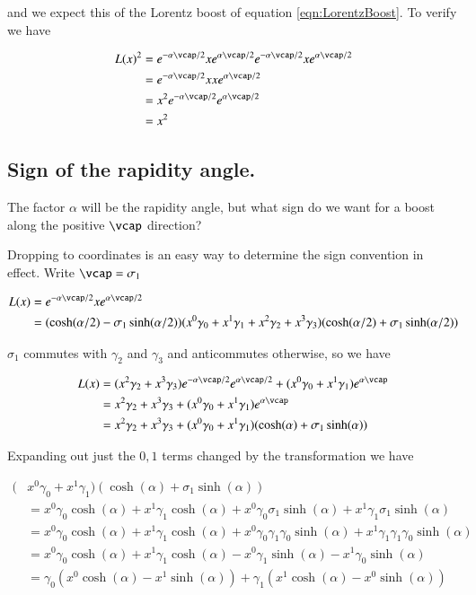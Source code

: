 \documentclass{article}
\begin{document}
and we expect this of the Lorentz boost of equation \ref{eqn:LorentzBoost}.  To verify we have

\begin{align*}
L(x)^2 
&=
e^{-\alpha \vcap/2}
x
e^{\alpha \vcap/2}
e^{-\alpha \vcap/2}
x
e^{\alpha \vcap/2} \\
&=
e^{-\alpha \vcap/2}
x
x
e^{\alpha \vcap/2} \\
&=
x^2
e^{-\alpha \vcap/2}
e^{\alpha \vcap/2} \\
&=
x^2
\end{align*}

\subsection{ Sign of the rapidity angle. }

The factor $\alpha$ will be the rapidity angle, but what sign do we want for a boost along the positive $\vcap$ direction?

Dropping to coordinates is an easy way to determine the sign convention in effect.  Write $\vcap = \sigma_1$

\begin{align*}
L(x) &= 
e^{-\alpha \vcap/2}
x
e^{\alpha \vcap/2} \\
&=
(\cosh(\alpha/2) - \sigma_1 \sinh(\alpha/2))
(
x^0 \gamma_0
+x^1 \gamma_1
+x^2 \gamma_2
+x^3 \gamma_3
)
(\cosh(\alpha/2) + \sigma_1 \sinh(\alpha/2))
\end{align*}

$\sigma_1$ commutes with $\gamma_2$ and $\gamma_3$ and anticommutes otherwise, so we have

\begin{align*}
L(x) &= 
(
x^2 \gamma_2
+x^3 \gamma_3
) 
e^{-\alpha \vcap/2}
e^{\alpha \vcap/2}
+
(
x^0 \gamma_0
+x^1 \gamma_1
)
e^{\alpha \vcap} \\
&=
x^2 \gamma_2
+x^3 \gamma_3
+(
x^0 \gamma_0
+x^1 \gamma_1
)
e^{\alpha \vcap} \\
&=
x^2 \gamma_2
+x^3 \gamma_3
+(
x^0 \gamma_0
+x^1 \gamma_1
)
(\cosh(\alpha) + \sigma_1 \sinh(\alpha))
\end{align*}

Expanding out just the $0,1$ terms changed by the transformation we have

\begin{align*}
(
&x^0 \gamma_0
+x^1 \gamma_1
)
(\cosh(\alpha) + \sigma_1 \sinh(\alpha)) \\
&=
x^0 \gamma_0 \cosh(\alpha) 
+x^1 \gamma_1 \cosh(\alpha) 
+x^0 \gamma_0 \sigma_1 \sinh(\alpha)
+x^1 \gamma_1 \sigma_1 \sinh(\alpha) \\
&=
x^0 \gamma_0 \cosh(\alpha) 
+x^1 \gamma_1 \cosh(\alpha) 
+x^0 \gamma_0 \gamma_1 \gamma_0 \sinh(\alpha)
+x^1 \gamma_1 \gamma_1 \gamma_0 \sinh(\alpha) \\
&=
x^0 \gamma_0 \cosh(\alpha) 
+x^1 \gamma_1 \cosh(\alpha) 
-x^0 \gamma_1 \sinh(\alpha)
-x^1 \gamma_0 \sinh(\alpha) \\
&=
\gamma_0 (x^0 \cosh(\alpha) -x^1 \sinh(\alpha) )
+\gamma_1 (x^1 \cosh(\alpha) -x^0 \sinh(\alpha) )
\\
\end{align*}
\end{document}
